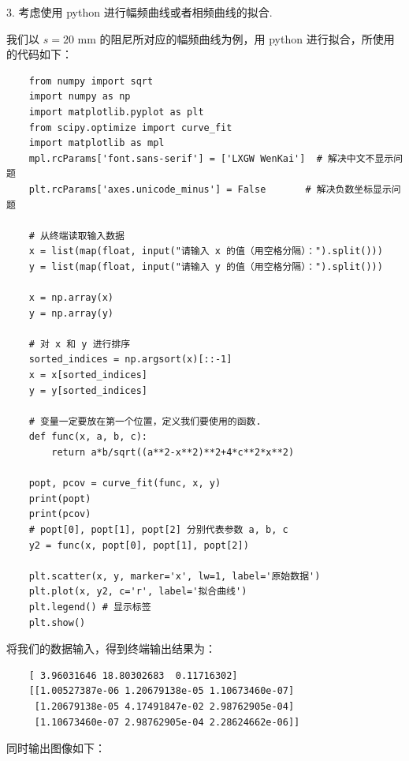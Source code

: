 \documentclass{THUexprep}
\begin{document}
3. 考虑使用 python 进行幅频曲线或者相频曲线的拟合.

我们以 $s=20\text{ mm}$ 的阻尼所对应的幅频曲线为例，用 python 进行拟合，所使用的代码如下：

\begin{verbatim}
    from numpy import sqrt
    import numpy as np
    import matplotlib.pyplot as plt
    from scipy.optimize import curve_fit
    import matplotlib as mpl
    mpl.rcParams['font.sans-serif'] = ['LXGW WenKai']  # 解决中文不显示问题
    plt.rcParams['axes.unicode_minus'] = False       # 解决负数坐标显示问题

    # 从终端读取输入数据
    x = list(map(float, input("请输入 x 的值（用空格分隔）：").split()))
    y = list(map(float, input("请输入 y 的值（用空格分隔）：").split()))

    x = np.array(x)
    y = np.array(y)

    # 对 x 和 y 进行排序
    sorted_indices = np.argsort(x)[::-1]
    x = x[sorted_indices]
    y = y[sorted_indices]

    # 变量一定要放在第一个位置，定义我们要使用的函数.
    def func(x, a, b, c):
        return a*b/sqrt((a**2-x**2)**2+4*c**2*x**2)

    popt, pcov = curve_fit(func, x, y) 
    print(popt) 
    print(pcov)
    # popt[0], popt[1], popt[2] 分别代表参数 a, b, c
    y2 = func(x, popt[0], popt[1], popt[2])

    plt.scatter(x, y, marker='x', lw=1, label='原始数据')
    plt.plot(x, y2, c='r', label='拟合曲线')
    plt.legend() # 显示标签
    plt.show()
\end{verbatim}

将我们的数据输入，得到终端输出结果为：

\begin{verbatim}
    [ 3.96031646 18.80302683  0.11716302]
    [[1.00527387e-06 1.20679138e-05 1.10673460e-07]
     [1.20679138e-05 4.17491847e-02 2.98762905e-04]
     [1.10673460e-07 2.98762905e-04 2.28624662e-06]]
\end{verbatim}

同时输出图像如下：
\end{document}

